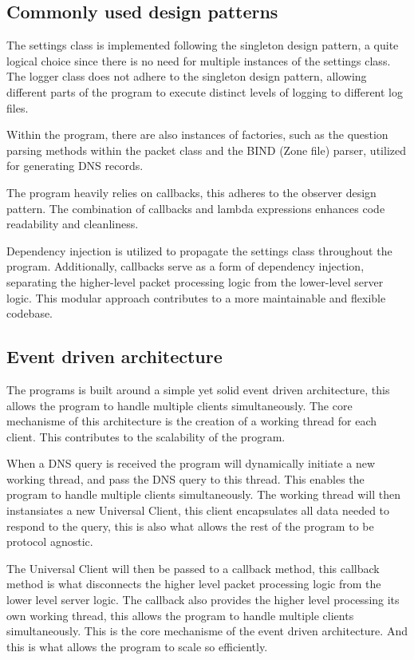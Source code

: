 \documentclass[12pt]{article}
\begin{document}
\subsection{Commonly used design patterns}

The settings class is implemented following the singleton design pattern, 
a quite logical choice since there is no need for multiple instances of the settings class. 
The logger class does not adhere to the singleton design pattern, 
allowing different parts of the program to execute distinct levels of logging to different log files.

Within the program, there are also instances of factories, 
such as the question parsing methods within the packet class and the BIND (Zone file) parser, utilized for generating DNS records.

The program heavily relies on callbacks, this adheres to the observer design pattern.
The combination of callbacks and lambda expressions enhances code readability and cleanliness.

Dependency injection is utilized to propagate the settings class throughout the program. 
Additionally, callbacks serve as a form of dependency injection, 
separating the higher-level packet processing logic from the lower-level server logic. 
This modular approach contributes to a more maintainable and flexible codebase.


\subsection{Event driven architecture}
The programs is built around a simple yet solid event driven architecture, this allows the program to handle multiple clients simultaneously.
The core mechanisme of this architecture is the creation of a working thread for each client. This contributes to the scalability of the program.

When a DNS query is received the program will dynamically initiate a new working thread, and pass the DNS query to this thread.
This enables the program to handle multiple clients simultaneously. The working thread will then instansiates a new Universal Client, this 
client encapsulates all data needed to respond to the query, this is also what allows the rest of the program to be protocol agnostic.

The Universal Client will then be passed to a callback method, this callback method is what disconnects the higher level packet processing logic
from the lower level server logic. The callback also provides the higher level processing its own working thread, this allows the program to handle
multiple clients simultaneously. This is the core mechanisme of the event driven architecture. And this is what allows the program to scale so efficiently.
\end{document}
